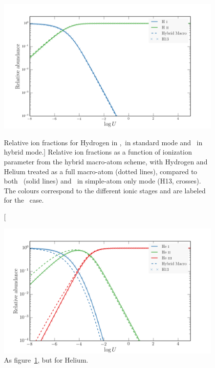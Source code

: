 \begin{figure}
\centering
\includegraphics[width=1.0\textwidth]{figures/03-radtrans/hy_comp.png}
\caption
[Relative ion fractions for Hydrogen in \cld,\py\ in standard mode and 
\py\ in hybrid mode.]
{
Relative ion fractions as a function of ionization parameter from the
hybrid macro-atom scheme, with Hydrogen and Helium 
treated as a full macro-atom (dotted lines), compared
to both \cld\ (solid lines) and \py\ in simple-atom only mode 
(H13, crosses). The colours correspond to the different ionic stages 
and are labeled for the \cld\ case.
}
\label{fig:h_cloudy}
\end{figure}

\begin{figure}
\centering
\includegraphics[width=1.0\textwidth]{figures/03-radtrans/he_comp.png}
\caption{
As figure~\ref{fig:h_cloudy}, but for Helium.
}
\label{fig:he_cloudy}
\end{figure}

